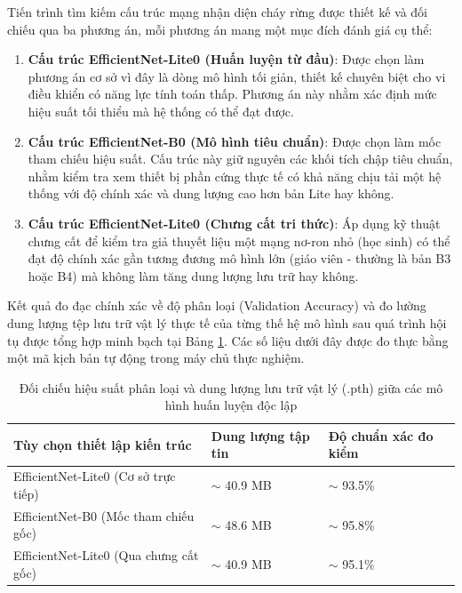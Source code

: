 \documentclass[12pt,a4paper]{report}
\begin{document}
Tiến trình tìm kiếm cấu trúc mạng nhận diện cháy rừng được thiết kế và đối chiếu qua ba phương án, mỗi phương án mang một mục đích đánh giá cụ thể:
\begin{enumerate}
    \item \textbf{Cấu trúc EfficientNet-Lite0 (Huấn luyện từ đầu)}: Được chọn làm phương án cơ sở vì đây là dòng mô hình tối giản, thiết kế chuyên biệt cho vi điều khiển có năng lực tính toán thấp. Phương án này nhằm xác định mức hiệu suất tối thiểu mà hệ thống có thể đạt được.
    \item \textbf{Cấu trúc EfficientNet-B0 (Mô hình tiêu chuẩn)}: Được chọn làm mốc tham chiếu hiệu suất. Cấu trúc này giữ nguyên các khối tích chập tiêu chuẩn, nhằm kiểm tra xem thiết bị phần cứng thực tế có khả năng chịu tải một hệ thống với độ chính xác và dung lượng cao hơn bản Lite hay không.
    \item \textbf{Cấu trúc EfficientNet-Lite0 (Chưng cất tri thức)}: Áp dụng kỹ thuật chưng cất \cite{hinton2015distilling} để kiểm tra giả thuyết liệu một mạng nơ-ron nhỏ (học sinh) có thể đạt độ chính xác gần tương đương mô hình lớn (giáo viên - thường là bản B3 hoặc B4) mà không làm tăng dung lượng lưu trữ hay không.
\end{enumerate}

Kết quả đo đạc chính xác về độ phân loại (Validation Accuracy) và đo lường dung lượng tệp lưu trữ vật lý thực tế của từng thế hệ mô hình sau quá trình hội tụ được tổng hợp minh bạch tại Bảng \ref{tab:training_options}. Các số liệu dưới đây được đo thực bằng một mã kịch bản tự động trong máy chủ thực nghiệm.

\begin{table}[h]
  \centering
  \caption{Đối chiếu hiệu suất phân loại và dung lượng lưu trữ vật lý (.pth) giữa các mô hình huấn luyện độc lập}
  \label{tab:training_options}
  \begin{tabular}{p{6.5cm} p{4cm} p{4cm}}
    \toprule
    \textbf{Tùy chọn thiết lập kiến trúc} & \textbf{Dung lượng tập tin} & \textbf{Độ chuẩn xác đo kiểm} \\
    \midrule
    EfficientNet-Lite0 (Cơ sở trực tiếp) & $\sim$ 40.9 MB & $\sim$ 93.5\% \\
    EfficientNet-B0 (Mốc tham chiếu gốc) & $\sim$ 48.6 MB & $\sim$ 95.8\% \\
    EfficientNet-Lite0 (Qua chưng cất gốc) & $\sim$ 40.9 MB & $\sim$ 95.1\% \\
    \bottomrule
  \end{tabular}
\end{table}
\end{document}
